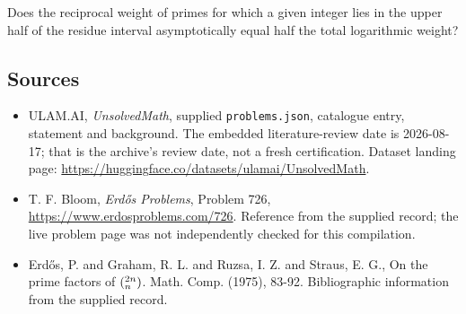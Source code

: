 \documentclass[11pt,a4paper]{article}
\begin{document}
Does the reciprocal weight of primes for which a given integer lies in the upper half of the residue interval asymptotically equal half the total logarithmic weight?

\subsection{Sources}

{\small

\begin{itemize}

\item[\hypertarget{source:statement:1}{S1}] ULAM.AI, \emph{UnsolvedMath}, supplied \texttt{problems.json}, catalogue entry, statement and background. The embedded literature-review date is 2026-08-17; that is the archive’s review date, not a fresh certification. Dataset landing page: \url{https://huggingface.co/datasets/ulamai/UnsolvedMath}.

\item[\hypertarget{source:statement:2}{S2}] T. F. Bloom, \emph{Erdős Problems}, Problem 726, \url{https://www.erdosproblems.com/726}. Reference from the supplied record; the live problem page was not independently checked for this compilation.

\item[\hypertarget{source:statement:3}{S3}] Erd\H{o}s, P. and Graham, R. L. and Ruzsa, I. Z. and Straus, E. G., On the prime factors of $(\sp{2n}\sb{n})$. Math. Comp. (1975), 83-92. Bibliographic information from the supplied record.

\end{itemize}

}

\label{end:statement}
\end{document}
